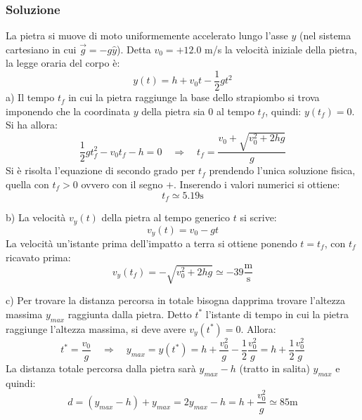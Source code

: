 \documentclass[12pt,a4paper]{book}
\begin{document}
\subsubsection*{Soluzione}
La pietra si muove di moto uniformemente accelerato lungo l'asse $y$ (nel sistema cartesiano in cui $\vec{g}=-g\hat{y}$). Detta $v_0=+12.0$ m/s la velocità iniziale della pietra, la legge oraria del corpo è:
\begin{equation*}
y(t)=h+v_0t - \frac{1}{2} gt^2 
\end{equation*}
a) Il tempo $t_f$ in cui la pietra raggiunge la base dello strapiombo
si trova imponendo che la coordinata $y$ della pietra sia $0$ al tempo $t_f$, quindi: $y(t_f)=0$. Si ha allora: 
\begin{equation*}
\frac{1}{2} gt_f^2 -v_0 t_f - h= 0 \quad \Rightarrow \quad t_f=\frac{v_0 + \sqrt{v_0^2+2hg}}{g}
\end{equation*}
Si è risolta l'equazione di secondo grado per $t_f$ prendendo l'unica soluzione fisica, quella con $t_f>0$ ovvero con il segno $+$. Inserendo i valori numerici si ottiene:
\begin{equation*}
t_f \simeq 5.19 \text{s}
\end{equation*}

b) La velocità $v_y(t)$ della pietra al tempo generico $t$ si scrive:
\begin{equation*}
v_y(t)=v_0 - gt 
\end{equation*}
La velocità un'istante prima dell'impatto a terra si ottiene ponendo $t=t_f$, con $t_f$ ricavato prima:
\begin{equation*}
v_y(t_f)=-\sqrt{v_0^2+2hg} \simeq - 39 \frac{\text{m}}{\text{s}}
\end{equation*}

c) Per trovare la distanza percorsa in totale bisogna dapprima
trovare l'altezza massima $y_{max}$ raggiunta dalla pietra. Detto $t^*$ l'istante di tempo in cui la pietra raggiunge l'altezza massima, si deve avere $v_y(t^*)=0$. Allora:
\begin{equation*}
t^*=\frac{v_0}{g} \quad \Rightarrow \quad y_{max}=y(t^*)=h+\frac{v_0^2}{g} - \frac{1}{2} \frac{v_0^2}{g} = h+\frac{1}{2} \frac{v_0^2}{g}
\end{equation*}
La distanza totale percorsa dalla pietra sarà $y_{max}-h$ (tratto in salita)  $y_{max}$ e quindi:
\begin{equation*}
d=(y_{max}-h)+y_{max}=2y_{max}- h = h+\frac{v_0^2}{g} \simeq 85 \text{m}
\end{equation*}
\end{document}
